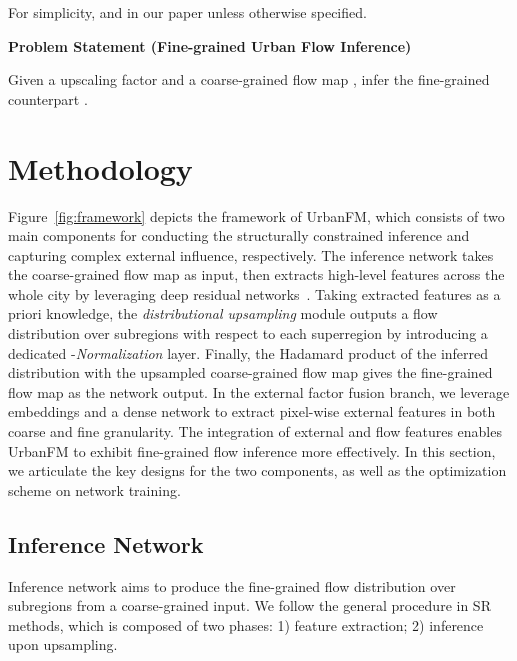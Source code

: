 \fi

For simplicity,  and  in our paper unless otherwise specified.

\noindent\textbf{Problem Statement (Fine-grained Urban Flow Inference)}

\noindent Given a upscaling factor  and a coarse-grained flow map , infer the fine-grained counterpart .



\section{Methodology}

Figure~\ref{fig:framework} depicts the framework of UrbanFM, which consists of two main components for conducting the structurally constrained inference and capturing complex external influence, respectively. The inference network takes the coarse-grained flow map  as input, then extracts high-level features across the whole city by leveraging deep residual networks~\cite{he2016deep}. Taking extracted features as a priori knowledge, the \textit{distributional upsampling} module outputs a flow distribution over subregions with respect to each superregion by introducing a dedicated -\textit{Normalization} layer. Finally, the Hadamard product of the inferred distribution with the upsampled coarse-grained flow map gives the fine-grained flow map  as the network output. In the external factor fusion branch, we leverage embeddings and a dense network to extract pixel-wise external features in both coarse and fine granularity. The integration of external and flow features enables UrbanFM to exhibit fine-grained flow inference more effectively. In this section, we articulate the key designs for the two components, as well as the optimization scheme on network training.

\vspace{-1mm}
\subsection{Inference Network\label{sec:infnet}}
Inference network aims to produce the fine-grained flow distribution over subregions from a coarse-grained input. We follow the general procedure in SR methods, which is composed of two phases: 1) feature extraction; 2) inference upon upsampling.

\vspace{-1mm}
